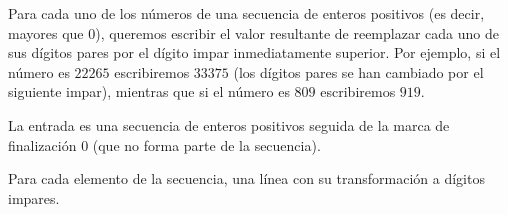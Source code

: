 
\Statement

Para cada uno de los números de una secuencia de enteros positivos (es decir, mayores que $0$), queremos escribir el valor resultante de reemplazar cada uno de sus dígitos pares por el dígito impar inmediatamente superior. Por ejemplo, si el número es $22265$ escribiremos $33375$ (los dígitos pares se han cambiado por el siguiente impar), mientras que si el número es $809$ escribiremos $919$.

\Input

La entrada es una secuencia de enteros positivos seguida de la marca de finalización $0$ (que no forma parte de la secuencia).

\Output

Para cada elemento de la secuencia, una línea con su transformación a dígitos impares.

\Sample
